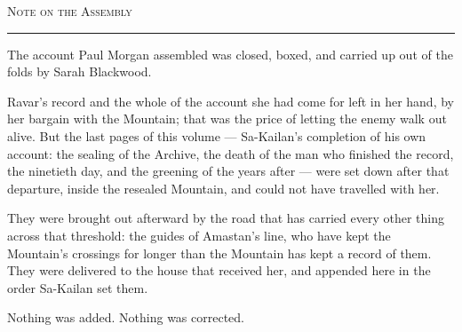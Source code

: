 \cleardoublepage
\thispagestyle{plain}
%
\vspace*{1.35in}
\begin{center}
{\Large\scshape Note on the Assembly}\par
\vspace{0.18in}
{\color{rulegold}\rule{0.34\textwidth}{0.35pt}}
\end{center}
\vspace{0.62in}

The account Paul Morgan assembled was closed, boxed, and carried up out of the folds by Sarah Blackwood.\par

Ravar's record and the whole of the account she had come for left in her hand, by her bargain with the Mountain; that was the price of letting the enemy walk out alive. But the last pages of this volume --- Sa-Kailan's completion of his own account: the sealing of the Archive, the death of the man who finished the record, the ninetieth day, and the greening of the years after --- were set down after that departure, inside the resealed Mountain, and could not have travelled with her.\par

They were brought out afterward by the road that has carried every other thing across that threshold: the guides of Amastan's line, who have kept the Mountain's crossings for longer than the Mountain has kept a record of them. They were delivered to the house that received her, and appended here in the order Sa-Kailan set them.\par

Nothing was added. Nothing was corrected.\par

\ornament

